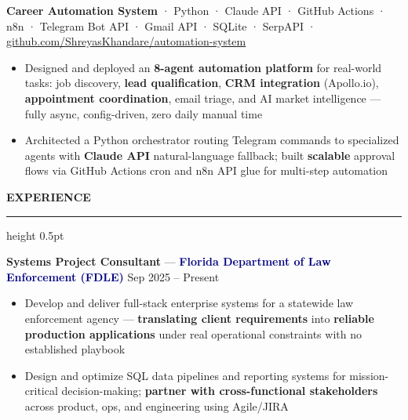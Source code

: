 \documentclass[10pt, letterpaper]{article}
\newcommand{\resumesection}[1]{%
  \vspace{8pt}%
  {\large\bfseries\color{navy} #1}%
  \vspace{2pt}%
  \hrule height 0.5pt \color{navy}%
  \vspace{4pt}%
}
\begin{document}
\vspace{4pt}
{\fontsize{9.5pt}{12pt}\selectfont
  \textbf{\color{darktext}Career Automation System}\enspace
  \textcolor{mutedtext}{·\enspace
    {\fontsize{8.5pt}{11pt}\selectfont
      Python · Claude API · GitHub Actions · n8n · Telegram Bot API · Gmail API · SQLite · SerpAPI
    }
  }\enspace
  \textcolor{midblue}{\fontsize{8.5pt}{11pt}\selectfont
    ·\enspace
    \href{https://github.com/ShreyasKhandare/automation-system}{github.com/ShreyasKhandare/automation-system}
  }
}

\begin{itemize}
  \item Designed and deployed an \textbf{8-agent automation platform} for real-world tasks: job discovery, \textbf{lead qualification}, \textbf{CRM integration} (Apollo.io), \textbf{appointment coordination}, email triage, and AI market intelligence --- fully async, config-driven, zero daily manual time
  \item Architected a Python orchestrator routing Telegram commands to specialized agents with \textbf{Claude API} natural-language fallback; built \textbf{scalable} approval flows via GitHub Actions cron and n8n API glue for multi-step automation
\end{itemize}

\resumesection{EXPERIENCE}

\vspace{2pt}
{\fontsize{9.5pt}{12pt}\selectfont
  \textbf{\color{darktext}Systems Project Consultant}\enspace
  \textcolor{mutedtext}{---}\enspace
  \textcolor{navy}{\textbf{Florida Department of Law Enforcement (FDLE)}}%
  \hfill
  \textcolor{mutedtext}{\fontsize{8.5pt}{11pt}\selectfont Sep 2025 -- Present}
}

\begin{itemize}
  \item Develop and deliver full-stack enterprise systems for a statewide law enforcement agency --- \textbf{translating client requirements} into \textbf{reliable production applications} under real operational constraints with no established playbook
  \item Design and optimize SQL data pipelines and reporting systems for mission-critical decision-making; \textbf{partner with cross-functional stakeholders} across product, ops, and engineering using Agile/JIRA
\end{itemize}
\end{document}
